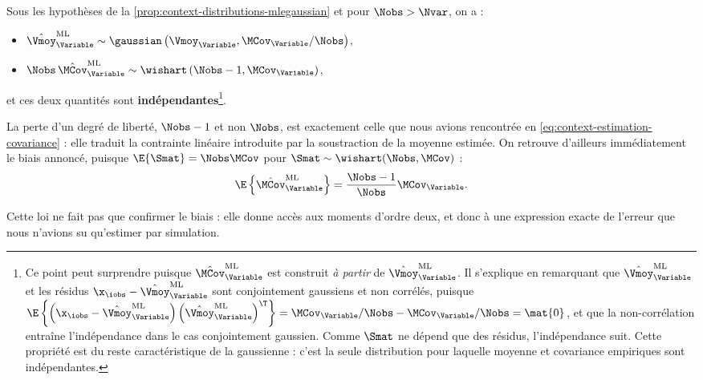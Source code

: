 \begin{proposition}
\label{prop:context-distributions-wishartscm}
  Sous les hypothèses de la \cref{prop:context-distributions-mlegaussian} et pour $\Nobs>\Nvar$, on a :
  \begin{itemize}
    \item $\hat{\Vmoy}_\Variable^{\mathrm{ML}} \sim \gaussian\left(\Vmoy_\Variable, \MCov_\Variable/\Nobs\right)$,
    \item $\Nobs\,\hat{\MCov}_\Variable^{\mathrm{ML}} \sim \wishart\left(\Nobs-1, \MCov_\Variable\right)$,
  \end{itemize}
  et ces deux quantités sont \textbf{indépendantes}\footnote{Ce point peut surprendre puisque $\hat{\MCov}_\Variable^{\mathrm{ML}}$ est construit \emph{à partir} de $\hat{\Vmoy}_\Variable^{\mathrm{ML}}$. Il s'explique en remarquant que $\hat{\Vmoy}_\Variable^{\mathrm{ML}}$ et les résidus $\x_\iobs-\hat{\Vmoy}_\Variable^{\mathrm{ML}}$ sont conjointement gaussiens et non corrélés, puisque $\E\left\{\left(\x_\iobs-\hat{\Vmoy}_\Variable^{\mathrm{ML}}\right)\left(\hat{\Vmoy}_\Variable^{\mathrm{ML}}\right)^\T\right\}=\MCov_\Variable/\Nobs - \MCov_\Variable/\Nobs = \mat{0}$, et que la non-corrélation entraîne l'indépendance dans le cas conjointement gaussien. Comme $\Smat$ ne dépend que des résidus, l'indépendance suit. Cette propriété est du reste caractéristique de la gaussienne : c'est la seule distribution pour laquelle moyenne et covariance empiriques sont indépendantes.}.
\end{proposition}

\begin{remark}
  La perte d'un degré de liberté, $\Nobs-1$ et non $\Nobs$, est exactement celle que nous avions rencontrée en \cref{eq:context-estimation-covariance} : elle traduit la contrainte linéaire introduite par la soustraction de la moyenne estimée. On retrouve d'ailleurs immédiatement le biais annoncé, puisque $\E\{\Smat\}=\Nobs\MCov$ pour $\Smat\sim\wishart(\Nobs,\MCov)$ :
  $$
  \E\left\{\hat{\MCov}_\Variable^{\mathrm{ML}}\right\}
  =
  \frac{\Nobs-1}{\Nobs}\MCov_\Variable.
  $$
\end{remark}

Cette loi ne fait pas que confirmer le biais : elle donne accès aux moments d'ordre deux, et donc à une expression exacte de l'erreur que nous n'avions su qu'estimer par simulation.

